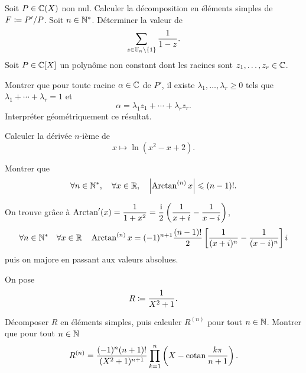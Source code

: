 \documentclass{magnolia}
\begin{document}
\begin{questions}
\question Soit $P\in\fracC$ non nul. Calculer la décomposition en éléments simples de $F\coloneqq P'/P$.
\question Soit $n\in{\mathbb{N}^*}$. Déterminer la valeur de
  \[\sum_{z\in\mathbb{U}_n\setminus\left\{1\right\}} \frac{1}{1-z}.\]
\question Soit $P\in\polyC$ un polynôme non constant dont les racines sont $z_1,\ldots,z_r\in\mathbb{C}$.
\begin{questions}
\question Montrer que pour toute racine $\alpha\in\mathbb{C}$ de $P'$, il existe $\lambda_1,\ldots,\lambda_r \geq 0$
  tels que $\lambda_1+\cdots+\lambda_r=1$ et \[\alpha=\lambda_1 z_1+\cdots+\lambda_r z_r.\]
\question Interpréter géométriquement ce résultat.
\end{questions}
\end{questions}


Calculer la dérivée $n$-ième de
\[x\mapsto\ln(x^2-x+2).\]

Montrer que
\[\forall n\in{\mathbb{N}^*} ,\quad \forall x\in\mathbb{R} ,\quad \left|\operatorname{Arctan}^{(n)} x\right|\leqslant(n-1)!.\]
\begin{sol}
On trouve grâce à $\operatorname{Arctan}'(x)=\dfrac{1}{1+x^2}=\dfrac{{\rm i}}{2}\left(\dfrac{1}{x+i}-\dfrac{1}{x-i}\right)$, 
\[\forall n\in{\mathbb{N}^*} \quad \forall x\in\mathbb{R} \quad \operatorname{Arctan}^{(n)} x=
  (-1)^{n+1}\frac{(n-1)!}{2}\left[\frac{1}{(x+i)^n}-\frac{1}{(x-i)^n}\right]i\]
  puis on majore en passant aux valeurs absolues.
\end{sol}

On pose
\[R\coloneqq\frac{1}{X^2+1}.\]
\begin{questions}
\question Décomposer $R$ en éléments simples, puis calculer $R^{(n)}$ pour tout $n\in\mathbb{N}$.
\question Montrer que pour tout $n\in\mathbb{N}$
  \[R^{(n)}=\frac{(-1)^n (n+1)!}{(X^2+1)^{n+1}}\prod_{k=1}^n \left(X-\operatorname{cotan}\frac{k\pi}{n+1}\right).\]
\end{questions}

\end{document}
